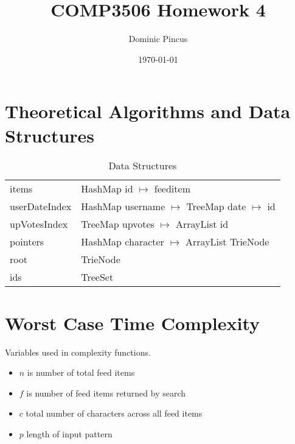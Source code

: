 \documentclass[11pt, oneside]{article}   	%
\title{COMP3506 Homework 4}
\author{Dominic Pincus}
\date{\today}
\begin{document}
\maketitle
\newpage

\section{Theoretical Algorithms and Data Structures}

\begin{table}[htp]
\caption{Data Structures}
\begin{center}
\begin{tabular}{l l}

items & HashMap id $\mapsto$ feeditem \\
userDateIndex & HashMap username $\mapsto$ TreeMap date $\mapsto$ id \\
upVotesIndex & TreeMap upvotes $\mapsto$ ArrayList id \\
pointers & HashMap character $\mapsto$ ArrayList TrieNode \\
root & TrieNode \\
ids & TreeSet \\

\end{tabular}
\end{center}
\label{default}
\end{table}

\section{Worst Case Time Complexity}

Variables used in complexity functions.

\begin{itemize}
\item $n$ is number of total feed items
\item $f$ is number of feed items returned by search
\item $c$ total number of characters across all feed items
\item $p$ length of input pattern
\end{itemize}
\end{document}
